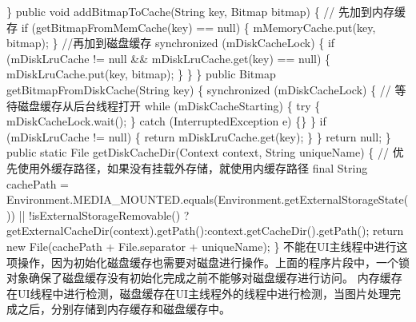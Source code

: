 \documentclass[9pt, b5paper]{article}
\begin{document}
\}
public void addBitmapToCache(String key, Bitmap bitmap) \{
    // 先加到内存缓存
    if (getBitmapFromMemCache(key) == null) \{
        mMemoryCache.put(key, bitmap);
    \}
    //再加到磁盘缓存
    synchronized (mDiskCacheLock) \{
        if (mDiskLruCache != null \&\& mDiskLruCache.get(key) == null) \{
            mDiskLruCache.put(key, bitmap);
        \}
    \}
\}
public Bitmap getBitmapFromDiskCache(String key) \{
    synchronized (mDiskCacheLock) \{
        // 等待磁盘缓存从后台线程打开
        while (mDiskCacheStarting) \{
            try \{
                mDiskCacheLock.wait();
            \} catch (InterruptedException e) \{\}
        \}
        if (mDiskLruCache != null) \{
            return mDiskLruCache.get(key);
        \}
    \}
    return null;
\}
public static File getDiskCacheDir(Context context, String uniqueName) \{
    // 优先使用外缓存路径，如果没有挂载外存储，就使用内缓存路径
final String cachePath =
            Environment.MEDIA\_MOUNTED.equals(Environment.getExternalStorageState()) ||
!isExternalStorageRemovable() ?getExternalCacheDir(context).getPath():context.getCacheDir().getPath();
    return new File(cachePath + File.separator + uniqueName);
\}
不能在UI主线程中进行这项操作，因为初始化磁盘缓存也需要对磁盘进行操作。上面的程序片段中，一个锁对象确保了磁盘缓存没有初始化完成之前不能够对磁盘缓存进行访问。
 内存缓存在UI线程中进行检测，磁盘缓存在UI主线程外的线程中进行检测，当图片处理完成之后，分别存储到内存缓存和磁盘缓存中。
\end{document}
